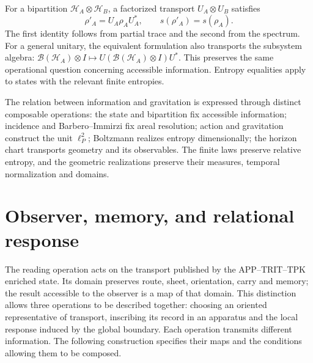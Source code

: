 For a bipartition \(\mathcal H_A\otimes\mathcal H_B\), a
factorized transport \(U_A\otimes U_B\) satisfies
\[
 \rho'_A=U_A\rho_AU_A^*,\qquad s(\rho'_A)=s(\rho_A).
\]
The first identity follows from partial trace and the second from the spectrum.
For a general unitary, the equivalent formulation also transports
the subsystem algebra:
\(\mathcal B(\mathcal H_A)\otimes I\mapsto
U(\mathcal B(\mathcal H_A)\otimes I)U^*\).
This preserves the same operational question concerning accessible
information. Entropy equalities apply to states with the relevant
finite entropies.

The relation between information and gravitation is expressed through
distinct composable operations: the state and bipartition fix
accessible information; incidence and Barbero--Immirzi fix areal
resolution; action and gravitation construct the unit \(\ell_P^2\);
Boltzmann realizes entropy dimensionally; the horizon chart
transports geometry and its observables. The finite laws preserve
relative entropy, and the geometric realizations preserve their measures,
temporal normalization and domains.




\chapter{Observer, memory, and relational response}
\label{x_reciprocidad:vii:sec:observador-respuesta}

The reading operation acts on the transport published by the
APP--TRIT--TPK enriched state. Its domain preserves route, sheet, orientation,
carry and memory; the result accessible to the observer is a map
of that domain. This distinction allows three operations to be described
together: choosing an oriented representative of transport,
inscribing its record in an apparatus and the local response induced
by the global boundary. Each operation transmits different information.
The following construction specifies their maps and the conditions
allowing them to be composed.

